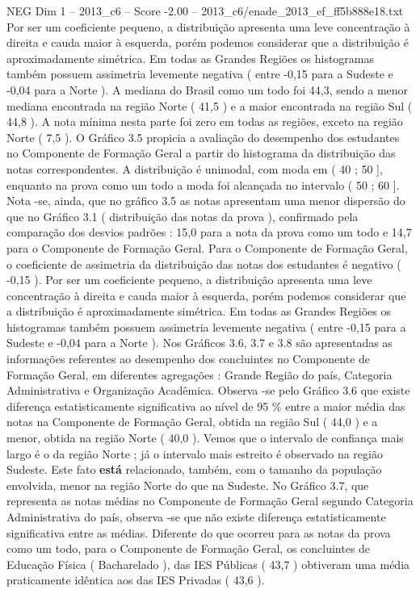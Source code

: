 \begin{textsample}{NEG Dim 1 – 2013\_c6 – Score -2.00 – 2013\_c6/enade\_2013\_ef\_ff5b888e18.txt}
Por ser um coeficiente pequeno, a distribuição apresenta uma leve concentração à direita e cauda maior à esquerda, porém podemos considerar que a distribuição é aproximadamente simétrica.
Em todas as Grandes Regiões os histogramas também possuem assimetria levemente negativa ( entre -0,15 para a Sudeste e -0,04 para a Norte ).
A mediana do Brasil como um todo foi 44,3, sendo a menor mediana encontrada na região Norte ( 41,5 ) e a maior encontrada na região Sul ( 44,8 ).
A nota mínima nesta parte foi zero em todas as regiões, exceto na região Norte ( 7,5 ).
O Gráfico 3.5 propicia a avaliação do desempenho dos estudantes no Componente de Formação Geral a partir do histograma da distribuição das notas correspondentes.
A distribuição é unimodal, com moda em ( 40 ; 50 ], enquanto na prova como um todo a moda foi alcançada no intervalo ( 50 ; 60 ].
Nota -se, ainda, que no gráfico 3.5 as notas apresentam uma menor dispersão do que no Gráfico 3.1 ( distribuição das notas da prova ), confirmado pela comparação dos desvios padrões : 15,0 para a nota da prova como um todo e 14,7 para o Componente de Formação Geral.
Para o Componente de Formação Geral, o coeficiente de assimetria da distribuição das notas dos estudantes é negativo ( -0,15 ).
Por ser um coeficiente pequeno, a distribuição apresenta uma leve concentração à direita e cauda maior à esquerda, porém podemos considerar que a distribuição é aproximadamente simétrica.
Em todas as Grandes Regiões os histogramas também possuem assimetria levemente negativa ( entre -0,15 para a Sudeste e -0,04 para a Norte ).
Nos Gráficos 3.6, 3.7 e 3.8 são apresentadas as informações referentes ao desempenho dos concluintes no Componente de Formação Geral, em diferentes agregações : Grande Região do país, Categoria Administrativa e Organização Acadêmica.
Observa -se pelo Gráfico 3.6 que existe diferença estatisticamente significativa ao nível de 95 \% entre a maior média das notas na Componente de Formação Geral, obtida na região Sul ( 44,0 ) e a menor, obtida na região Norte ( 40,0 ).
Vemos que o intervalo de confiança mais largo é o da região Norte ; já o intervalo mais estreito é observado na região Sudeste.
Este fato \textbf{está} relacionado, também, com o tamanho da população envolvida, menor na região Norte do que na Sudeste.
No Gráfico 3.7, que representa as notas médias no Componente de Formação Geral segundo Categoria Administrativa do país, observa -se que não existe diferença estatisticamente significativa entre as médias.
Diferente do que ocorreu para as notas da prova como um todo, para o Componente de Formação Geral, os concluintes de Educação Física ( Bacharelado ), das IES Públicas ( 43,7 ) obtiveram uma média praticamente idêntica aos das IES Privadas ( 43,6 ).

\end{textsample}
